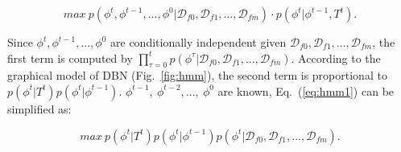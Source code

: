 \vspace{-5mm}
\begin{equation}
max\ p({\phi}^t,{\phi}^{t-1}, ...,{\phi}^0|\mathcal{D}_{f0},\mathcal{D}_{f1}, ..., \mathcal{D}_{fm})\cdot p({\phi}^t|{\phi}^{t-1},T^t).
\label{eq:hmm1}
\end{equation}




Since ${\phi}^t, {\phi}^{t-1}, ..., {\phi}^0$ are conditionally independent given $\mathcal{D}_{f0},\mathcal{D}_{f1}, ..., \mathcal{D}_{fm}$,
the first term is computed by $\prod\limits_{\tau=0}^{t}p({\phi}^\tau|\mathcal{D}_{f0},\mathcal{D}_{f1}, ..., \mathcal{D}_{fm})$.
According to the graphical model of DBN (Fig.~\ref{fig:hmm}), the second term is proportional to $p({\phi}^{t}|T^{t})p({\phi}^{t}|{\phi}^{t-1})$.
 ${\phi}^{t-1},\ {\phi}^{t-2},...,\ {\phi}^{0}$ are known, Eq.~(\ref{eq:hmm1}) can be simplified as:

\vspace{-4mm}
\begin{equation}
max\ p({\phi}^t|T^t)p({\phi}^{t}|{\phi}^{t-1})p({\phi}^{t}|\mathcal{D}_{f0},\mathcal{D}_{f1}, ..., \mathcal{D}_{fm}).
\label{eq:hmm2}
\end{equation}

